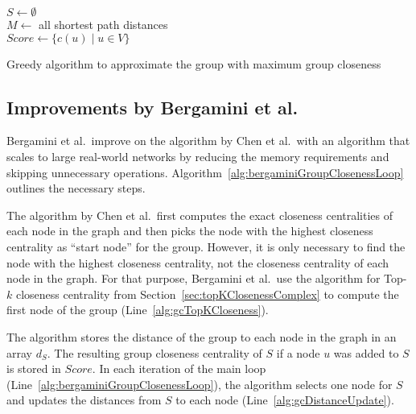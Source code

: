 \begin{algorithm2e}[h!]
  \label{alg:chenGroupCloseness}
 
  $S \gets \emptyset$ \\
  $M \gets $ all shortest path distances \\
  $Score \gets \{c(u) \mid u \in V\}$ \label{alg:initScore} \\
  \caption{Greedy algorithm to approximate the group with maximum group closeness}
\end{algorithm2e}

\subsection{Improvements by Bergamini et al.}
Bergamini et al.\ improve on the algorithm by Chen et al.\ with an algorithm that scales to large real-world networks by reducing the memory requirements and skipping unnecessary operations. Algorithm~\ref{alg:bergaminiGroupClosenessLoop} outlines the necessary steps.

The algorithm by Chen et al.\ first computes the exact closeness centralities of each node in the graph and then picks the node with the highest closeness centrality as ``start node'' for the group. However, it is only necessary to find the node with the highest closeness centrality, not the closeness centrality of each node in the graph. For that purpose, Bergamini et al.\ use the algorithm for Top-$k$ closeness centrality from Section~\ref{sec:topKClosenessComplex} to compute the first node of the group (Line~\ref{alg:gcTopKCloseness}).

The algorithm stores the distance of the group to each node in the graph in an array $d_S$. The resulting group closeness centrality of $S$ if a node $u$ was added to $S$ is stored in $Score$. In each iteration of the main loop (Line~\ref{alg:bergaminiGroupClosenessLoop}), the algorithm selects one node for $S$ and updates the distances from $S$ to each node (Line~\ref{alg:gcDistanceUpdate}).

